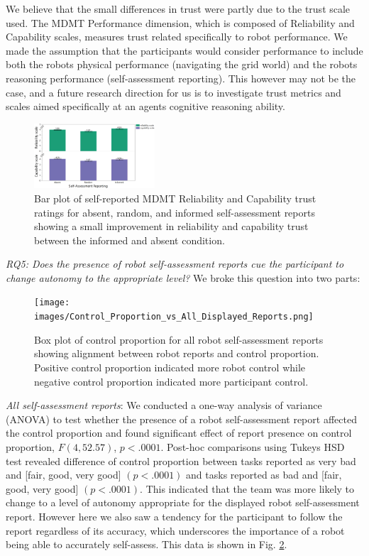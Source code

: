 \documentclass[aaai]{article}
\begin{document}
We believe that the small differences in trust were partly due to the trust scale used. The MDMT Performance dimension, which is composed of Reliability and Capability scales, measures trust related specifically to robot performance. We made the assumption that the participants would consider performance to include both the robots physical performance (navigating the grid world) and the robots reasoning performance (self-assessment reporting). This however may not be the case, and a future research direction for us is to investigate trust metrics and scales aimed specifically at an agents cognitive reasoning ability.

\begin{figure}[htbp]
    \centering
    \includegraphics[width=0.4\textwidth]{images/trust_vs_reporting.png}
    \caption{Bar plot of self-reported MDMT Reliability and Capability trust ratings for absent, random, and informed self-assessment reports showing a small improvement in reliability and capability trust between the informed and absent condition.}
    \label{fig:TRUST_VS_ACCURACY}
\end{figure}

\emph{RQ5: Does the presence of robot self-assessment reports cue the participant to change autonomy to the appropriate level?} We broke this question into two parts:

\begin{figure}[htbp]
    \centering
    \texttt{[image: images/Control\_Proportion\_vs\_All\_Displayed\_Reports.png]}
    \caption{Box plot of control proportion for all robot self-assessment reports showing alignment between robot reports and control proportion. Positive control proportion indicated more robot control while negative control proportion indicated more participant control.}
    \label{fig:CONT_PROP_VS_ALL_SINGLE_REPORTS}
\end{figure}

\emph{All self-assessment reports}: We conducted a one-way analysis of variance (ANOVA) to test whether the presence of a robot self-assessment report affected the control proportion and found significant effect of report presence on control proportion, $F(4, 52.57)$, $p <.0001$. Post-hoc comparisons using Tukeys HSD test revealed difference of control proportion between tasks reported as very bad and [fair, good, very good] $(p< .0001)$ and tasks reported as bad  and [fair, good, very good] $(p<.0001)$. This indicated that the team was more likely to change to a level of autonomy appropriate for the displayed robot self-assessment report. However here we also saw a tendency for the participant to follow the report regardless of its accuracy, which underscores the importance of a robot being able to accurately self-assess. This data is shown in Fig. \ref{fig:CONT_PROP_VS_ALL_SINGLE_REPORTS}.
\end{document}
